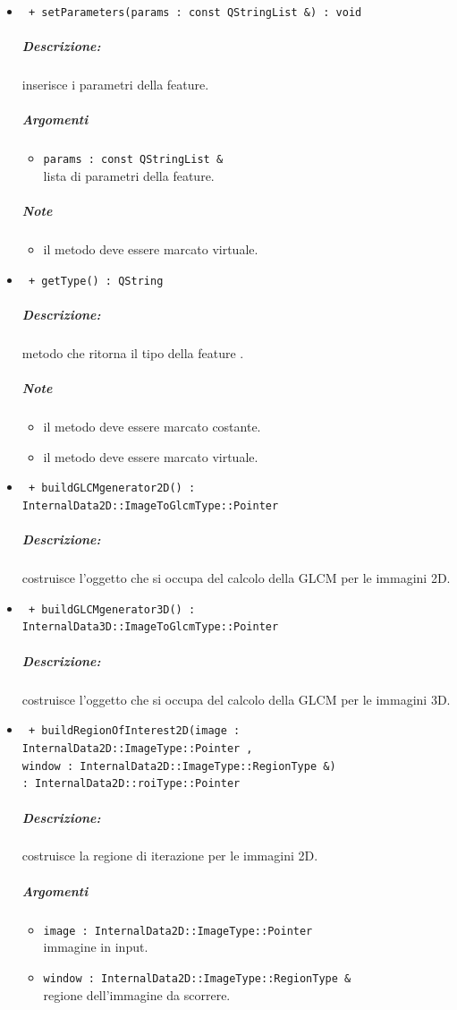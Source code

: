 \begin{itemize}
	\item \color{blue}\verb! + setParameters(params : const QStringList &) : void!
		\color{black}
		\subparagraph{Descrizione:} inserisce i parametri della feature\g{}.
		\subparagraph{Argomenti}
			\begin{itemize}
				\item \color{RoyalPurple} \verb!params : const QStringList & ! \\ 
				\color{black} lista di parametri della feature.		
			\end{itemize}
		\subparagraph{Note}
			\begin{itemize}
				\item il metodo deve essere marcato virtuale.
			\end{itemize}
			
	\item \color{blue}\verb! + getType() : QString!
		\color{black}
		\subparagraph{Descrizione:} metodo che ritorna il tipo della feature\g{} .
		\subparagraph{Note}
			\begin{itemize}
				\item il metodo deve essere marcato costante.
				\item il metodo deve essere marcato virtuale.
			\end{itemize}
			
			
	\item \color{blue}\verb! + buildGLCMgenerator2D() : InternalData2D::ImageToGlcmType::Pointer !
		\color{black}
		\subparagraph{Descrizione:} costruisce l'oggetto che si occupa del calcolo della GLCM per le immagini 2D.
		
	\item \color{blue}\verb! + buildGLCMgenerator3D() : InternalData3D::ImageToGlcmType::Pointer !
		\color{black}
		\subparagraph{Descrizione:} costruisce l'oggetto che si occupa del calcolo della GLCM per le immagini 3D.
		
	\item \color{blue}\verb! + buildRegionOfInterest2D(image : InternalData2D::ImageType::Pointer , !\\																	\verb!window : InternalData2D::ImageType::RegionType &) !\\
													\verb!: InternalData2D::roiType::Pointer  !					
		\color{black}
		\subparagraph{Descrizione:} costruisce la regione di iterazione per le immagini 2D.
		\subparagraph{Argomenti}
			\begin{itemize}
				\item \color{RoyalPurple} \verb!image : InternalData2D::ImageType::Pointer ! \\ 
				\color{black} immagine in input.		
			\end{itemize}
			\begin{itemize}
				\item \color{RoyalPurple} \verb!window : InternalData2D::ImageType::RegionType & ! \\ 
				\color{black} regione dell'immagine da scorrere.		
			\end{itemize}
			

\end{itemize}

